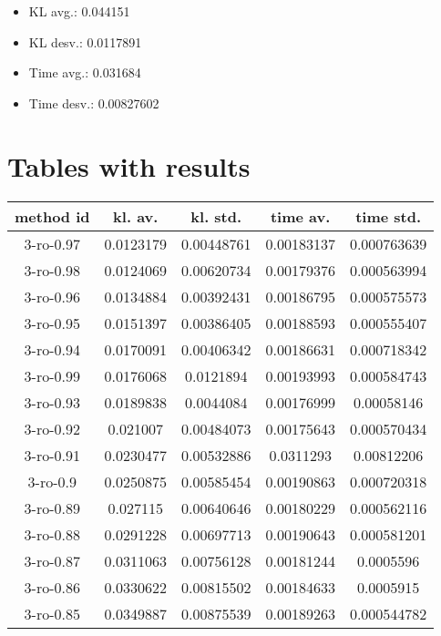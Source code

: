 \documentclass[12pt]{article}
\begin{document}
 \medskip
\begin{itemize}
\item KL avg.:  0.044151 
\item KL desv.:  0.0117891 
\item Time avg.:  0.031684 
\item Time desv.:  0.00827602 
\end{itemize}


\section{Tables with results}
\begin{table}[h!]
\centering
\begin{tabular}{|c|c|c|c|c|}\hline
method id & kl. av. & kl. std. & time av. & time std. \\\hline
3-ro-0.97 & 0.0123179   & 0.00448761   & 0.00183137   & 0.000763639  \\\hline
3-ro-0.98 & 0.0124069   & 0.00620734   & 0.00179376   & 0.000563994  \\\hline
3-ro-0.96 & 0.0134884   & 0.00392431   & 0.00186795   & 0.000575573  \\\hline
3-ro-0.95 & 0.0151397   & 0.00386405   & 0.00188593   & 0.000555407  \\\hline
3-ro-0.94 & 0.0170091   & 0.00406342   & 0.00186631   & 0.000718342  \\\hline
3-ro-0.99 & 0.0176068   & 0.0121894   & 0.00193993   & 0.000584743  \\\hline
3-ro-0.93 & 0.0189838   & 0.0044084   & 0.00176999   & 0.00058146  \\\hline
3-ro-0.92 & 0.021007   & 0.00484073   & 0.00175643   & 0.000570434  \\\hline
3-ro-0.91 & 0.0230477   & 0.00532886   & 0.0311293   & 0.00812206  \\\hline
3-ro-0.9 & 0.0250875   & 0.00585454   & 0.00190863   & 0.000720318  \\\hline
3-ro-0.89 & 0.027115   & 0.00640646   & 0.00180229   & 0.000562116  \\\hline
3-ro-0.88 & 0.0291228   & 0.00697713   & 0.00190643   & 0.000581201  \\\hline
3-ro-0.87 & 0.0311063   & 0.00756128   & 0.00181244   & 0.0005596  \\\hline
3-ro-0.86 & 0.0330622   & 0.00815502   & 0.00184633   & 0.0005915  \\\hline
3-ro-0.85 & 0.0349887   & 0.00875539   & 0.00189263   & 0.000544782  \\\hline

\end{tabular}
\end{table}
\end{document}
